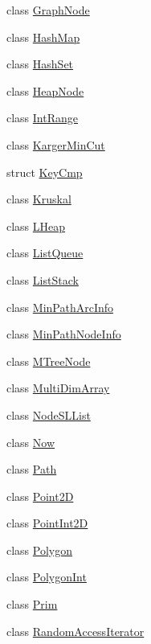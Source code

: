 \begin{DoxyCompactItemize}
\item 
class \hyperlink{class_designar_1_1_graph_node}{Graph\+Node}
\item 
class \hyperlink{class_designar_1_1_hash_map}{Hash\+Map}
\item 
class \hyperlink{class_designar_1_1_hash_set}{Hash\+Set}
\item 
class \hyperlink{class_designar_1_1_heap_node}{Heap\+Node}
\item 
class \hyperlink{class_designar_1_1_int_range}{Int\+Range}
\item 
class \hyperlink{class_designar_1_1_karger_min_cut}{Karger\+Min\+Cut}
\item 
struct \hyperlink{struct_designar_1_1_key_cmp}{Key\+Cmp}
\item 
class \hyperlink{class_designar_1_1_kruskal}{Kruskal}
\item 
class \hyperlink{class_designar_1_1_l_heap}{L\+Heap}
\item 
class \hyperlink{class_designar_1_1_list_queue}{List\+Queue}
\item 
class \hyperlink{class_designar_1_1_list_stack}{List\+Stack}
\item 
class \hyperlink{class_designar_1_1_min_path_arc_info}{Min\+Path\+Arc\+Info}
\item 
class \hyperlink{class_designar_1_1_min_path_node_info}{Min\+Path\+Node\+Info}
\item 
class \hyperlink{class_designar_1_1_m_tree_node}{M\+Tree\+Node}
\item 
class \hyperlink{class_designar_1_1_multi_dim_array}{Multi\+Dim\+Array}
\item 
class \hyperlink{class_designar_1_1_node_s_l_list}{Node\+S\+L\+List}
\item 
class \hyperlink{class_designar_1_1_now}{Now}
\item 
class \hyperlink{class_designar_1_1_path}{Path}
\item 
class \hyperlink{class_designar_1_1_point2_d}{Point2D}
\item 
class \hyperlink{class_designar_1_1_point_int2_d}{Point\+Int2D}
\item 
class \hyperlink{class_designar_1_1_polygon}{Polygon}
\item 
class \hyperlink{class_designar_1_1_polygon_int}{Polygon\+Int}
\item 
class \hyperlink{class_designar_1_1_prim}{Prim}
\item 
class \hyperlink{class_designar_1_1_random_access_iterator}{Random\+Access\+Iterator}

\end{DoxyCompactItemize}
